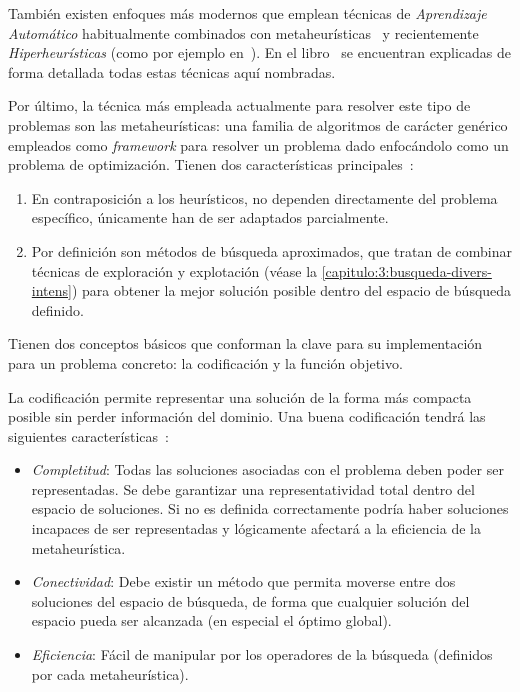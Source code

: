 También existen enfoques más modernos que emplean técnicas de \textit{Aprendizaje Automático} habitualmente combinados con metaheurísticas~\cite{sota:machine-learning-geneticos} y recientemente \textit{Hiperheurísticas} (como por ejemplo en~\cite{sota:hiperheuristicas}). En el libro~\cite{sota:libro-sota-scheduling} se encuentran explicadas de forma detallada todas estas técnicas aquí nombradas.

Por último, la técnica más empleada actualmente para resolver este tipo de problemas son las metaheurísticas: una familia de algoritmos de carácter genérico empleados como \textit{framework} para resolver un problema dado enfocándolo como un problema de optimización. Tienen dos características principales~\cite{sota:metaheuristicas}:

\begin{enumerate}
    \item En contraposición a los heurísticos, no dependen directamente del problema específico, únicamente han de ser adaptados parcialmente.
    \item Por definición son métodos de búsqueda aproximados, que tratan de combinar técnicas de exploración y explotación (véase la \autoref{capitulo:3:busqueda-divers-intens}) para obtener la mejor solución posible dentro del espacio de búsqueda definido.
\end{enumerate}

Tienen dos conceptos básicos que conforman la clave para su implementación para un problema concreto: la codificación y la función objetivo.

La codificación permite representar una solución de la forma más compacta posible sin perder información del dominio. Una buena codificación tendrá las siguientes características~\cite{sota:metaheuristicas-design-impl}:

\begin{itemize}
    \item \textit{Completitud}: Todas las soluciones asociadas con el problema deben poder ser representadas. Se debe garantizar una representatividad total dentro del espacio de soluciones. Si no es definida correctamente podría haber soluciones incapaces de ser representadas y lógicamente afectará a la eficiencia de la metaheurística.
    \item \textit{Conectividad}: Debe existir un método que permita moverse entre dos soluciones del espacio de búsqueda, de forma que cualquier solución del espacio pueda ser alcanzada (en especial el óptimo global).
    \item \textit{Eficiencia}: Fácil de manipular por los operadores de la búsqueda (definidos por cada metaheurística).
\end{itemize}

